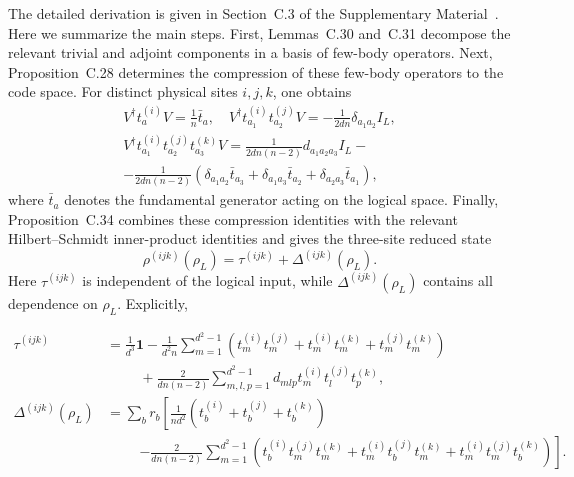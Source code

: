 \documentclass[10pt,twocolumn,superscriptaddress,aps,amsmath,amssymb,citeautoscript,floatfix,prx,longbibliography]{revtex4-2}
\theoremstyle{plain}
\theoremstyle{plain}
\theoremstyle{plain}
\theoremstyle{plain}
\theoremstyle{plain}
\theoremstyle{plain}
\begin{document}
The detailed derivation is given in Section~C.3 of the Supplementary Material~\cite{SuppMat}. Here we summarize the main steps. First, Lemmas~C.30 and~C.31 decompose the relevant trivial and adjoint components in a basis of few-body operators. Next, Proposition~C.28 determines the compression of these few-body operators to the code space. For distinct physical sites $i,j,k$, one obtains
$$
\begin{gathered}
V^{\dagger} t_a^{(i)} V=\frac{1}{n} \bar{t}_a, \quad V^{\dagger} t_{a_1}^{(i)} t_{a_2}^{(j)} V=-\frac{1}{2 d n} \delta_{a_1 a_2} I_L, \\
V^{\dagger} t_{a_1}^{(i)} t_{a_2}^{(j)} t_{a_3}^{(k)} V=\frac{1}{2 d n(n-2)} d_{a_1 a_2 a_3} I_L-\\-\frac{1}{2 d n(n-2)}\left(\delta_{a_1 a_2} \bar{t}_{a_3}+\delta_{a_1 a_3} \bar{t}_{a_2}+\delta_{a_2 a_3} \bar{t}_{a_1}\right),
\end{gathered}
$$
where $\bar t_a$ denotes the fundamental generator acting on the logical space. Finally, Proposition~C.34 combines these compression identities with the relevant Hilbert--Schmidt inner-product identities and gives the three-site reduced state
\begin{equation}\label{eq:3q_reduced_state}
    \rho^{(ijk)}(\rho_L)
    =
    \tau^{(ijk)}
    +
    \Delta^{(ijk)}(\rho_L).
\end{equation}
Here $\tau^{(ijk)}$ is independent of the logical input, while $\Delta^{(ijk)}(\rho_L)$ contains all dependence on $\rho_L$. Explicitly,
\begin{widetext}
\begin{align}
\tau^{(ijk)}
&=
\frac{1}{d^3}\mathbf 1
-\frac{1}{d^2 n}
\sum_{m=1}^{d^2-1}
\left(
t_m^{(i)}t_m^{(j)}
+t_m^{(i)}t_m^{(k)}
+t_m^{(j)}t_m^{(k)}
\right)
\nonumber\\
&\hspace{1cm}
+\frac{2}{dn(n-2)}
\sum_{m,l,p=1}^{d^2-1}
d_{mlp}
t_m^{(i)}t_l^{(j)}t_p^{(k)},
\\
\Delta^{(ijk)}(\rho_L)
&=
\sum_b r_b
\left[
\frac{1}{nd^2}
\left(
t_b^{(i)}
+t_b^{(j)}
+t_b^{(k)}
\right)
\right.
\nonumber\\
&\hspace{1cm}
\left.
-\frac{2}{dn(n-2)}
\sum_{m=1}^{d^2-1}
\left(
t_b^{(i)}t_m^{(j)}t_m^{(k)}
+t_m^{(i)}t_b^{(j)}t_m^{(k)}
+t_m^{(i)}t_m^{(j)}t_b^{(k)}
\right)
\right].
\end{align}
\end{widetext}
\end{document}
